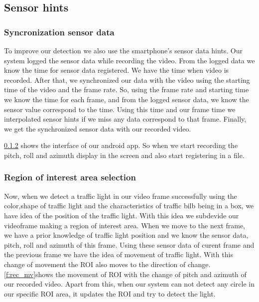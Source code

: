 \subsection{Sensor hints}
\subsubsection{Syncronization sensor data}
To improve our detection we also use the smartphone's sensor data hints.
Our system logged the sensor data while recording the video.
From the logged data we know the time for sensor data registered.
We have the time when video is recorded.
After that, we synchronized our data with the video using the starting time of the video and the frame rate.
So, using the frame rate and starting time we know the time for each frame, and from the logged sensor data, we know the sensor value correspond to the time.
Using this time and our frame time we interpolated sensor hints if we miss any data correspond to that frame.
Finally, we get the synchronized sensor data with our recorded video.

\ref{} shows the interface of our android app.
So when we start recording the pitch, roll and azimuth display in the screen and also start registering in a file.

\subsubsection{Region of interest area selection}
Now, when we detect a traffic light in our video frame successfully using the color,shape of traffic light and the characteristics of traffic bilb being in a box, we have idea of the position of the traffic light.
With this idea we subdevide our videoframe making a region of interest area.
When we move to the next frame, we have a prior knowledge of traffic light position and we know the sensor data, pitch, roll and azimuth of this frame.
Using these sensor data of curent frame and the previous frame we have the idea of movement of traffic light.
With this change of movement the ROI also moves to the direction of change.
\ref{f:rec_mv}shows the movement of ROI with the change of pitch and azimuth of our recorded video.
Apart from this, when our system can not detect any circle in our specific ROI area, it updates the ROI and try to detect the light.

